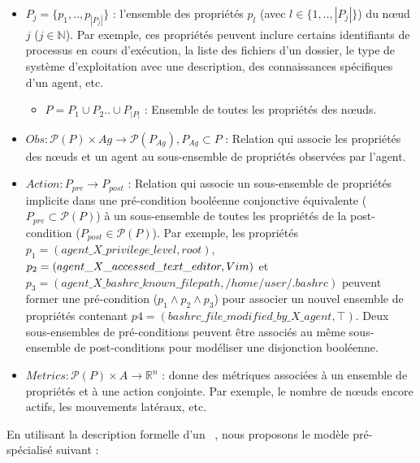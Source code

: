 \begin{itemize}
  \item $P_{j} = \{ p_1, .., p_{|P_{j}|} \}$ : l'ensemble des propriétés $p_{l}$ (avec $l \in \{1,..,|P_{j}|\}$) du nœud $j$ ($j \in \mathbb{N} $). Par exemple, ces propriétés peuvent inclure certains identifiants de processus en cours d'exécution, la liste des fichiers d'un dossier, le type de système d'exploitation avec une description, des connaissances spécifiques d'un agent, etc.
        \begin{itemize}
          \item $P = P_1 \cup P_2 .. \cup P_{|P|} $ : Ensemble de toutes les propriétés des nœuds.
        \end{itemize}

  \item $Obs : \mathcal{P}(P) \times Ag \rightarrow \mathcal{P}(P_{Ag}), P_{Ag} \subset P$ : Relation qui associe les propriétés des nœuds et un agent au sous-ensemble de propriétés observées par l'agent.



  \item $Action : P_{pre} \rightarrow P_{post}$ : Relation qui associe un sous-ensemble de propriétés implicite dans une pré-condition booléenne conjonctive équivalente ($P_{pre} \subset \mathcal{P}(P)$) à un sous-ensemble de toutes les propriétés de la post-condition ($P_{post} \in \mathcal{P}(P)$). Par exemple, les propriétés $p_1 = (agent\_X\_privilege\_level, \allowbreak root)$, $p_2 = (agent\_X\_acce\-\allowbreak ssed\_text\_editor, \allowbreak Vim)$ et $p_3 = (agent\_X\_bashrc\_known\_filepath, \allowbreak /home/user/ \allowbreak .bashrc)$ peuvent former une pré-condition ($p_1 \land p_2 \land p_3$) pour associer un nouvel ensemble de propriétés contenant $p4 = (bashrc\_file\_modified\_by\_X\_agent, \top)$. Deux sous-ensembles de pré-conditions peuvent être associés au même sous-ensemble de post-conditions pour modéliser une disjonction booléenne.

  \item $Metrics: \mathcal{P}(P) \times A \rightarrow \mathbb{R}^{n}$ : donne des métriques associées à un ensemble de propriétés et à une action conjointe. Par exemple, le nombre de nœuds encore actifs, les mouvements latéraux, etc.

\end{itemize}


En utilisant la description formelle d'un ~\cite{Oliehoek2016}, nous proposons le modèle  pré-spécialisé suivant :

